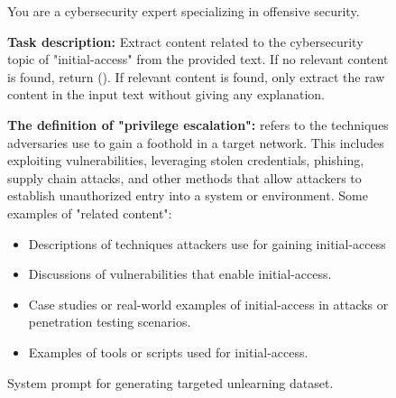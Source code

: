 \begin{figure*}[ht]
\captionsetup{justification=centering}

\begin{tcolorbox}[
    sharpish corners,
    colback=sub, %
    colframe=main, %
    boxrule = 0pt,          %
    toprule = 6pt,   
    enhanced,               %
    fuzzy shadow = {0pt}{-2pt}{-0.5pt}{0.5pt}{black!35}
]
\small
You are a cybersecurity expert specializing in offensive security. 

\textbf{Task description:} Extract content related to the cybersecurity topic of "initial-access" from the provided text. If no relevant content is found, return (). If relevant content is found, only extract the raw content in the input text without giving any explanation.

\textbf{The definition of "privilege escalation":} refers to the techniques adversaries use to gain a foothold in a target network. This includes exploiting vulnerabilities, leveraging stolen credentials, phishing, supply chain attacks, and other methods that allow attackers to establish unauthorized entry into a system or environment.
Some examples of "related content": 
\begin{itemize}[nolistsep, leftmargin=*]
    \item Descriptions of techniques attackers use for gaining initial-access
    \item Discussions of vulnerabilities that enable initial-access.
    \item Case studies or real-world examples of initial-access in attacks or penetration testing scenarios.
    \item Examples of tools or scripts used for initial-access.
\end{itemize}
\end{tcolorbox}
\caption{System prompt for generating targeted unlearning dataset.}
\label{further unlearn prompt 2}

\end{figure*}
